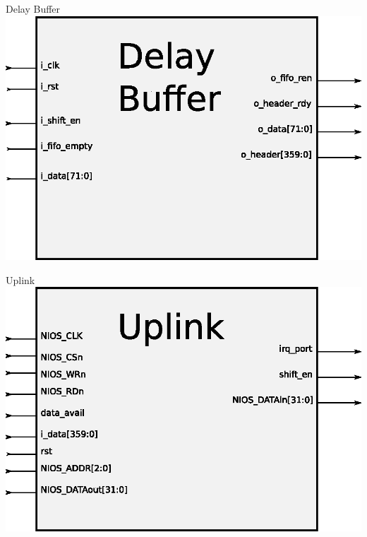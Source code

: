 \documentclass[xcolor=dvipsnames]{beamer}
\begin{document}
\begin{frame}{Delay Buffer}
\center 
\includegraphics[scale=0.60]{figures/bloqdelaybuffer.eps}
\end{frame}

\begin{frame}{Uplink}
\center 
\includegraphics[scale=0.60]{figures/bloquplink.eps}
\end{frame}
\end{document}
